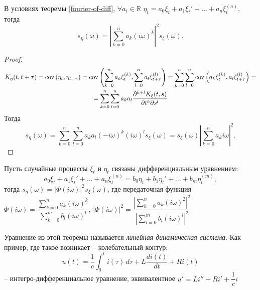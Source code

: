 \begin{theorem}
  В условиях теоремы \ref{fourier-of-diff}, $\forall a_i \in \mathbb{R}$
  $\eta_t = a_0 \xi_t + a_1 \xi_t' + \dots + a_n \xi_t^{(n)}$, тогда
  \[
    s_{\eta}(\omega) = \left| \sum_{k=0}^n a_k (i\omega)^k \right|^2 s_\xi(\omega).
  \]
\end{theorem}
\begin{proof}
  \begin{multline*}
    K_\eta(t, t+\tau) = \operatorname{cov} \left( \eta_t, \eta_{t+\tau} \right) =
    \operatorname{cov} \left( \sum_{k=0}^n a_k \xi_t^{(k)}, \sum_{l=0}^n a_l \xi_{t+\tau}^{(l)} \right) =
    \sum_{k=0}^n \sum_{l=0}^n \operatorname{cov} \left( a_k \xi_{t}^{(k)}, a_l \xi_{t+\tau}^{(l)} \right) = \\
    =
    \sum_{k=0}^n \sum_{l=0}^n a_k a_l \dfrac{\partial^{k+l} K_\xi(t, s)}{\partial t^k \partial s^l}
  \end{multline*}
  Тогда
  \[
    s_\eta(\omega) = \sum_{k=0}^n \sum_{l=0}^n a_k a_l (-i\omega)^k (i\omega)^l s_\xi(\omega) =
    s_\xi(\omega) \left| \sum_{k=0}^n a_k i\omega \right| ^2.
  \]
\end{proof}

\begin{theorem}
  Пусть случайные процессы $\xi_t $ и $\eta_t$ связаны дифференциальным уравнением:
  \[
    a_0 \xi_t + a_1 \xi_t' + \dots + a_n \xi_t^{(n)} = 
    b_0 \eta_t + b_1 \eta_t' + \dots + b_m \eta_t^{(m)},
  \]
  тогда $s_\eta(\omega) = |\Phi(i\omega)|^2 s_\xi(\omega)$, где передаточная функция
  $\Phi(i\omega) = \dfrac{\sum_{k=0}^n a_k (i\omega)^k}{\sum_{k=0}^m b_l (i\omega)^l}$,
  $ \left| \Phi(i\omega) \right|^2 = \dfrac{ \left| \sum_{k=0}^n a_k (i\omega)^2 \right|^2  }{ \left| \sum_{l=0}^m b_l (i\omega)^l \right|^2 } $
\end{theorem}

Уравнение из этой теоремы называется \emph{линейная динамическая система}. Как пример,
где такое возникает -- колебательный контур:
\[
  u(t) = \dfrac{1}{c} \int_0^t i(\tau) \, d\tau + L \dfrac{di(t)}{dt} + R i(t)
\]
-- интегро-дифференциальное уравнение, эквивалентное $u' = L i'' + R i' + \dfrac{1}{c} i$
